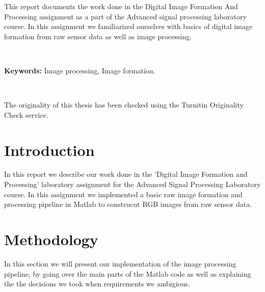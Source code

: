 \documentclass[12pt,a4paper,english
]{tunithesis}
\begin{document}
\vspace{0.5cm}


\noindent
This report documents the work done in the Digital Image Formation And Processing assignment as a part of the Advanced signal processing laboratory course. In this assignment we familiarized ourselves with basics of digital image formation from raw sensor data as well as image processing.

~

\noindent\textbf{Keywords:} Image processing, Image formation.

~

\noindent The originality of this thesis has been checked using the Turnitin Originality Check service.




\setcounter{tocdepth}{3}              %
\tableofcontents                      %


\if@twoside
\cleardoublepage
\fi


\renewcommand{\chaptername}{} %


\chapter{Introduction}
\label{ch:intro} 
In this report we describe our work done in the 'Digital Image Formation and Processing' laboratory assignment for the Advanced Signal Processing Laboratory course. In this assignment we implemented a basic raw image formation and processing pipeline in Matlab to construcut RGB images from raw sensor data.

\setcounter{page}{1} 

\chapter{Methodology}
\label{sec:methodology}
In this section we will present our implementation of the image processing pipeline, by going over the main parts of the Matlab code as well as explaining the the decisions we took when requirements we ambigious.
\end{document}
